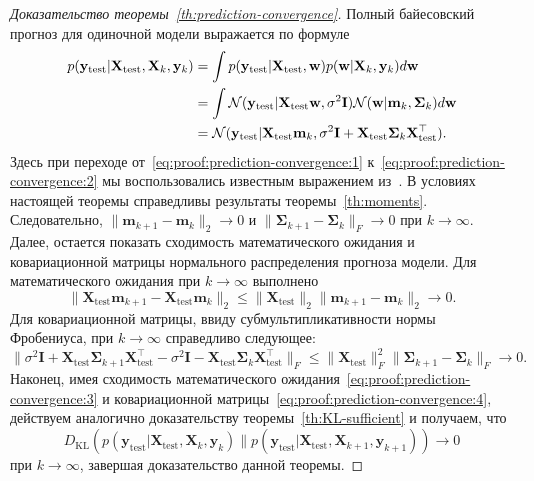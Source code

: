 \begin{proof}[Доказательство теоремы~\ref{th:prediction-convergence}]
    Полный байесовский прогноз для одиночной модели выражается по формуле
    \begin{align}
        p(\mathbf{y}_{\text{test}}|\mathbf{X}_{\text{test}}, \mathbf{X}_k, \mathbf{y}_k)
        &= \int p(\mathbf{y}_{\text{test}}|\mathbf{X}_{\text{test}}, \mathbf{w}) p(\mathbf{w}|\mathbf{X}_k, \mathbf{y}_k) d\mathbf{w} \notag \\
        &= \int \mathcal{N}(\mathbf{y}_{\text{test}} | \mathbf{X}_{\text{test}}\mathbf{w}, \sigma^2 \mathbf{I}) \mathcal{N}(\mathbf{w} | \mathbf{m}_k, \boldsymbol{\Sigma}_k) d\mathbf{w} \label{eq:proof:prediction-convergence:1} \\
        &= \mathcal{N}(\mathbf{y}_{\text{test}} | \mathbf{X}_{\text{test}} \mathbf{m}_k, \sigma^2 \mathbf{I} + \mathbf{X}_{\text{test}} \boldsymbol{\Sigma}_k \mathbf{X}_{\text{test}}^\top). \label{eq:proof:prediction-convergence:2}
    \end{align}
    Здесь при переходе от~\eqref{eq:proof:prediction-convergence:1} к~\eqref{eq:proof:prediction-convergence:2} мы воспользовались известным выражением из~\cite{bishop2006pattern}. В условиях настоящей теоремы справедливы результаты теоремы~\ref{th:moments}. Следовательно, $\|\mathbf{m}_{k+1} - \mathbf{m}_k\|_2 \to 0$ и $\|\boldsymbol{\Sigma}_{k+1} - \boldsymbol{\Sigma}_k\|_F \to 0$ при $k \to \infty$. Далее, остается показать сходимость математического ожидания и ковариационной матрицы нормального распределения прогноза модели. Для математического ожидания при $k \to \infty$ выполнено
    \begin{equation}
        \|\mathbf{X}_{\text{test}} \mathbf{m}_{k+1} - \mathbf{X}_{\text{test}} \mathbf{m}_{k}\|_2 \leqslant \|\mathbf{X}_{\text{test}}\|_2 \|\mathbf{m}_{k+1} - \mathbf{m}_k\|_2 \to 0.
        \label{eq:proof:prediction-convergence:3}
    \end{equation}
    Для ковариационной матрицы, ввиду субмультипликативности нормы Фробениуса, при $k \to \infty$ справедливо следующее:
    \begin{equation}
        \|\sigma^2 \mathbf{I} + \mathbf{X}_{\text{test}} \boldsymbol{\Sigma}_{k+1} \mathbf{X}_{\text{test}}^\top - \sigma^2 \mathbf{I} - \mathbf{X}_{\text{test}} \boldsymbol{\Sigma}_{k} \mathbf{X}_{\text{test}}^\top\|_F \leqslant \|\mathbf{X}_{\text{test}}\|_F^2 \|\boldsymbol{\Sigma}_{k+1} - \boldsymbol{\Sigma}_{k}\|_F \to 0.
        \label{eq:proof:prediction-convergence:4}
    \end{equation}
    Наконец, имея сходимость математического ожидания~\eqref{eq:proof:prediction-convergence:3} и ковариационной матрицы~\eqref{eq:proof:prediction-convergence:4}, действуем аналогично доказательству теоремы~\ref{th:KL-sufficient} и получаем, что
    \begin{equation}
        D_{\mathrm{KL}}\left(p(\mathbf{y}_{\text{test}}|\mathbf{X}_{\text{test}}, \mathbf{X}_k, \mathbf{y}_k) \| p(\mathbf{y}_{\text{test}}|\mathbf{X}_{\text{test}}, \mathbf{X}_{k+1}, \mathbf{y}_{k+1})\right) \to 0
    \end{equation}
    при $k \to \infty$, завершая доказательство данной теоремы.
\end{proof}

